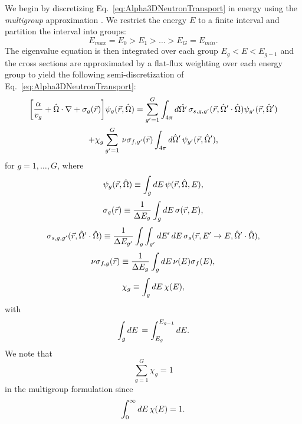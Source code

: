 We begin by discretizing Eq.~\ref{eq:Alpha3DNeutronTransport} in energy using the \textit{multigroup} approximation \cite{duderstadt_nuclear_1976}. We restrict the energy $E$ to a finite interval and partition the interval into groups:
\begin{equation*}
	E_{max} = E_{0} > E_{1} > \dots > E_{G} = E_{min}.
\end{equation*}
The eigenvalue equation is then integrated over each group $E_{g} < E < E_{g-1}$ and the cross sections are approximated by a flat-flux weighting over each energy group to yield the following semi-discretization of Eq.~\ref{eq:Alpha3DNeutronTransport}:
\begin{multline}
	\bigg [ \frac{\alpha}{v_{g}} + \hat{\Omega} \cdot \nabla + \sigma_{g}(\vec{r}) \bigg ] \psi_{g}(\vec{r},\hat{\Omega}) = \sum_{g'=1}^{G} \int_{4\pi} \mathop{}\!d \hat{\Omega'} \, \sigma_{s,g,g'}(\vec{r},\hat{\Omega}' \cdot \hat{\Omega}) \psi_{g'}(\vec{r},\hat{\Omega}') \\ + \chi_{g} \sum_{g'=1}^{G} \, \nu\sigma_{f,g'}(\vec{r}) \int_{4\pi} \mathop{}\!d \hat{\Omega}' \, \psi_{g'}(\vec{r},\hat{\Omega}'), 
	\label{eq:Alpha3DMG}
\end{multline}
for $g = 1, \dots, G$, where
\begin{equation}
	\psi_{g}(\vec{r},\hat{\Omega}) \equiv \int_{g} \mathop{}\!d E \, \psi(\vec{r},\hat{\Omega},E),
\end{equation}
\begin{equation}
	 \sigma_{g}(\vec{r}) \equiv \frac{1}{\Delta E_{g}} \int_{g} \mathop{}\!d E \, \sigma(\vec{r},E),
\end{equation}
\begin{equation}
	 \sigma_{s,g,g'}(\vec{r},\hat{\Omega}' \cdot \hat{\Omega}) \equiv \frac{1}{\Delta E_{g'}} \int_{g} \int_{g'} \mathop{}\!d E' \mathop{}\!d E \, \sigma_{s}(\vec{r},E'\rightarrow E,\hat{\Omega}' \cdot \hat{\Omega}),
\end{equation}
\begin{equation}
	\nu\sigma_{f,g}(\vec{r}) \equiv \frac{1}{\Delta E_{g}} \int_{g} \mathop{}\!d E \, \nu(E) \sigma_{f}(E),
\end{equation}
\begin{equation}
	\chi_{g} \equiv \int_{g} \mathop{}\!d E \, \chi(E),
\end{equation}
with
\begin{equation}
	\int_{g} \mathop{}\!d E \, = \int_{E_{g}}^{E_{g-1}} \mathop{}\!d E.
\end{equation}
We note that 
\begin{equation}
	\sum_{g=1}^{G} \chi_{g} = 1
\end{equation}
in the multigroup formulation since
\begin{equation}
	\int_{0}^{\infty} \mathop{}\!d E \, \chi(E) = 1.
\end{equation}

